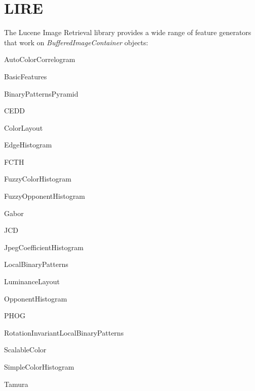 \documentclass[a4paper]{book}
\begin{document}
\chapter{LIRE}
The Lucene Image Retrieval library \cite{lire} provides a wide range of feature
generators that work on \textit{BufferedImageContainer} objects:
\begin{tight_itemize}
  \item AutoColorCorrelogram
  \item BasicFeatures
  \item BinaryPatternsPyramid
  \item CEDD
  \item ColorLayout
  \item EdgeHistogram
  \item FCTH
  \item FuzzyColorHistogram
  \item FuzzyOpponentHistogram
  \item Gabor
  \item JCD
  \item JpegCoefficientHistogram
  \item LocalBinaryPatterns
  \item LuminanceLayout
  \item OpponentHistogram
  \item PHOG
  \item RotationInvariantLocalBinaryPatterns
  \item ScalableColor
  \item SimpleColorHistogram
  \item Tamura
\end{tight_itemize}


\end{document}
